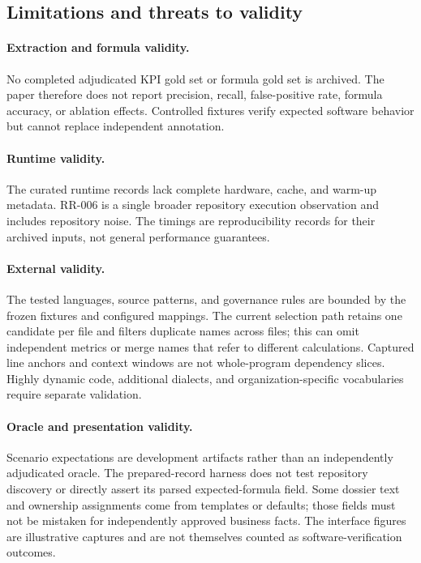 \documentclass[a4paper,fleqn]{cas-dc}
\begin{document}
\subsection{Limitations and threats to validity}

\paragraph{Extraction and formula validity.}
No completed adjudicated KPI gold set or formula gold set is archived. The paper therefore does not report precision, recall, false-positive rate, formula accuracy, or ablation effects. Controlled fixtures verify expected software behavior but cannot replace independent annotation.

\paragraph{Runtime validity.}
The curated runtime records lack complete hardware, cache, and warm-up metadata. RR-006 is a single broader repository execution observation and includes repository noise. The timings are reproducibility records for their archived inputs, not general performance guarantees.

\paragraph{External validity.}
The tested languages, source patterns, and governance rules are bounded by the frozen fixtures and configured mappings. The current selection path retains one candidate per file and filters duplicate names across files; this can omit independent metrics or merge names that refer to different calculations. Captured line anchors and context windows are not whole-program dependency slices. Highly dynamic code, additional dialects, and organization-specific vocabularies require separate validation.

\paragraph{Oracle and presentation validity.}
Scenario expectations are development artifacts rather than an independently adjudicated oracle. The prepared-record harness does not test repository discovery or directly assert its parsed expected-formula field. Some dossier text and ownership assignments come from templates or defaults; those fields must not be mistaken for independently approved business facts. The interface figures are illustrative captures and are not themselves counted as software-verification outcomes.
\end{document}
